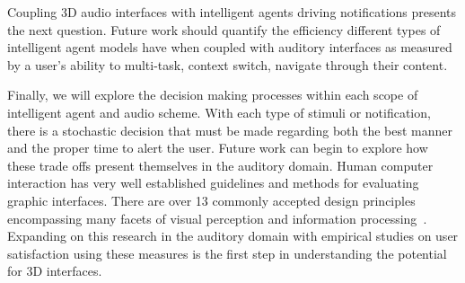 Coupling 3D audio interfaces with intelligent agents driving notifications
presents the next question. Future work should quantify the efficiency
different types of intelligent agent models have when coupled with auditory
interfaces as measured by a user's ability to multi-task, context switch,
navigate through their content.

Finally, we will explore the decision making processes within each scope of
intelligent agent and audio scheme. With each type of stimuli or notification,
there is a stochastic decision that must be made regarding both the best manner
and the proper time to alert the user. Future work can begin to  explore how
these trade offs present themselves in the auditory domain. Human computer
interaction has very well established guidelines and methods for evaluating
graphic interfaces. There are over 13 commonly accepted design principles
encompassing many facets of visual perception and information
processing~\cite{wickens2004intro}. Expanding on this research in the auditory
domain with empirical studies on user satisfaction using these measures is the
first step in understanding the potential for 3D interfaces.
